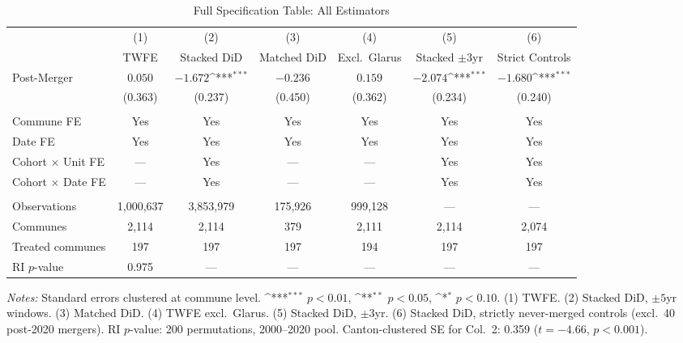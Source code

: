 \documentclass[12pt]{article}
\newcommand{\sym}[1]{\ifmmode^{#1}\else\(^{#1}\)\fi} %
\begin{document}
\begin{table}[H]
    \centering
    \caption{Full Specification Table: All Estimators}
    \begin{adjustbox}{max width=\textwidth}
    \begin{tabular}{lcccccc}
        \toprule
        & (1) & (2) & (3) & (4) & (5) & (6) \\
        & TWFE & Stacked DiD & Matched DiD & Excl.\ Glarus & Stacked $\pm$3yr & Strict Controls \\
        \midrule
        Post-Merger & $0.050$ & $-1.672$\sym{***} & $-0.236$ & $0.159$ & $-2.074$\sym{***} & $-1.680$\sym{***} \\
        & (0.363) & (0.237) & (0.450) & (0.362) & (0.234) & (0.240) \\
        \\
        Commune FE & Yes & Yes & Yes & Yes & Yes & Yes \\
        Date FE & Yes & Yes & Yes & Yes & Yes & Yes \\
        Cohort $\times$ Unit FE & --- & Yes & --- & --- & Yes & Yes \\
        Cohort $\times$ Date FE & --- & Yes & --- & --- & Yes & Yes \\
        \\
        Observations & 1,000,637 & 3,853,979 & 175,926 & 999,128 & --- & --- \\
        Communes & 2,114 & 2,114 & 379 & 2,111 & 2,114 & 2,074 \\
        Treated communes & 197 & 197 & 197 & 194 & 197 & 197 \\
        RI $p$-value & 0.975 & --- & --- & --- & --- & --- \\
        \bottomrule
    \end{tabular}
    \end{adjustbox}
    \begin{minipage}{\textwidth}
    \vspace{0.3cm}
    \footnotesize \textit{Notes:} Standard errors clustered at commune level. \sym{***} $p<0.01$, \sym{**} $p<0.05$, \sym{*} $p<0.10$. (1) TWFE. (2) Stacked DiD, $\pm 5$yr windows. (3) Matched DiD. (4) TWFE excl.\ Glarus. (5) Stacked DiD, $\pm 3$yr. (6) Stacked DiD, strictly never-merged controls (excl.\ 40 post-2020 mergers). RI $p$-value: 200 permutations, 2000--2020 pool. Canton-clustered SE for Col.\ 2: 0.359 ($t = -4.66$, $p < 0.001$).
    \end{minipage}
    \label{tab:full_specs}
\end{table}
\end{document}
